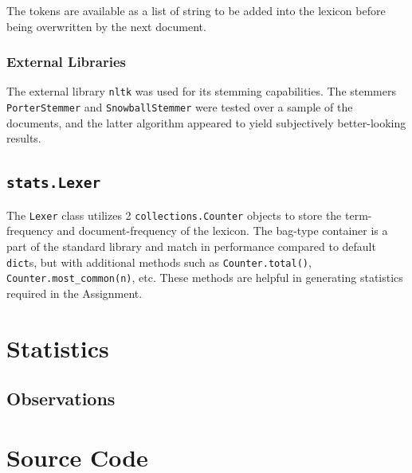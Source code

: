 \documentclass[11pt]{article}
\begin{document}
The tokens are available as a list of string to be added into the lexicon before being overwritten by the next document.

\subsubsection{External Libraries}
The external library \texttt{nltk} was used for its stemming capabilities. The stemmers \texttt{PorterStemmer} and \texttt{SnowballStemmer} were tested over a sample of the documents, and the latter algorithm appeared to yield subjectively better-looking results.

\subsection{\texttt{stats.Lexer}}
The \texttt{Lexer} class utilizes 2 \texttt{collections.Counter} objects to store the term-frequency and document-frequency of the lexicon. The bag-type container is a part of the standard library and match in performance compared to default \texttt{dict}s, but with additional methods such as \texttt{Counter.total()}, \texttt{Counter.most\_common(n)}, etc. These methods are helpful in generating statistics required in the Assignment.

\section{Statistics}

\subsection{Observations}

\appendix

\section{Source Code} \label{appendix:src}


\end{document}
